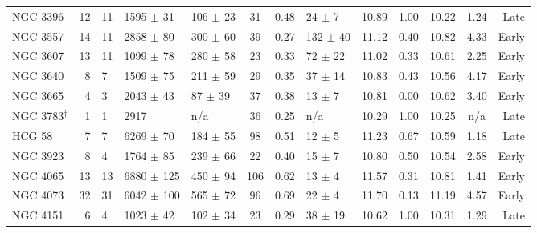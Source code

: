 \begin{table*}
\begin{center}
\begin{tabular}{@{}lr@{\hspace{0.1cm}}lllccl@{\hspace{0.2cm}}ccc@{\hspace{0.2cm}}c@{\hspace{0.2cm}}r@{}}
NGC 3396              &  12  &  11                    &  1595 $\pm$ 31   &  106 $\pm$ 23   &  31        &  0.48      &  24   $\pm$ 7   &  10.89          &  1.00  &  10.22          &  1.24   &  Late     \\
NGC 3557              &  14  &  11                    &  2858 $\pm$ 80   &  300 $\pm$ 60   &  39        &  0.27      &  132  $\pm$ 40  &  11.12          &  0.40  &  10.82          &  4.33   &  Early    \\
NGC 3607              &  13  &  11                    &  1099 $\pm$ 78   &  280 $\pm$ 58   &  23        &  0.33      &  72   $\pm$ 22  &  11.02          &  0.33  &  10.61          &  2.25   &  Early    \\
NGC 3640              &  8   &  7                     &  1509 $\pm$ 75   &  211 $\pm$ 59   &  29        &  0.35      &  37   $\pm$ 14  &  10.83          &  0.43  &  10.56          &  4.17   &  Early    \\
NGC 3665              &  4   &  3                     &  2043 $\pm$ 43   &  87  $\pm$ 39   &  37        &  0.38      &  13   $\pm$ 7   &  10.81          &  0.00  &  10.62          &  3.40   &  Early    \\
NGC 3783$^{\dagger}$  &  1   &  1                     &  2917            &  n/a            &  36        &  0.25      &  n/a            &  10.29          &  1.00  &  10.25          &  n/a    &  Late     \\
HCG 58                &  7   &  7                     &  6269 $\pm$ 70   &  184 $\pm$ 55   &  98        &  0.51      &  12   $\pm$ 5   &  11.23          &  0.67  &  10.59          &  1.18   &  Late     \\
NGC 3923              &  8   &  4                     &  1764 $\pm$ 85   &  239 $\pm$ 66   &  22        &  0.40      &  15   $\pm$ 7   &  10.80          &  0.50  &  10.54          &  2.58   &  Early    \\
NGC 4065              &  13  &  13                    &  6880 $\pm$ 125  &  450 $\pm$ 94   &  106       &  0.62      &  13   $\pm$ 4   &  11.57          &  0.31  &  10.81          &  1.41   &  Early    \\
NGC 4073              &  32  &  31                    &  6042 $\pm$ 100  &  565 $\pm$ 72   &  96        &  0.69      &  22   $\pm$ 4   &  11.70          &  0.13  &  11.19          &  4.57   &  Early    \\
NGC 4151              &  6   &  4                     &  1023 $\pm$ 42   &  102 $\pm$ 34   &  23        &  0.29      &  38   $\pm$ 19  &  10.62          &  1.00  &  10.31          &  1.29   &  Late     \\

\end{tabular}
\end{center}
\end{table*}
